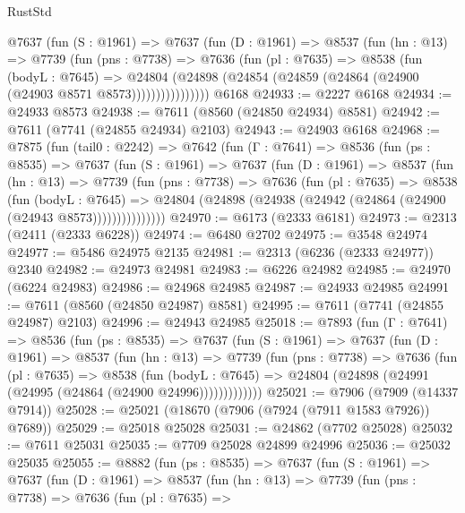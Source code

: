 \begin{lexlean}{RustStd}
\begin{coremodule}
          @7637
            (fun (S : @1961) =>
            @7637
              (fun (D : @1961) =>
              @8537
                (fun (hn : @13) =>
                @7739
                  (fun (pns : @7738) =>
                  @7636
                    (fun (pl : @7635) =>
                    @8538
                      (fun (bodyL : @7645) =>
                      @24804
                        (@24898 (@24854 (@24859 (@24864 (@24900 (@24903 @8571 @8573))))))))))))))))
    @6168
@24933 := @2227 @6168
@24934 := @24933 @8573
@24938 := @7611 (@8560 (@24850 @24934) @8581)
@24942 := @7611 (@7741 (@24855 @24934) @2103)
@24943 := @24903 @6168
@24968 := @7875
    (fun (tail0 : @2242) =>
    @7642
      (fun (Γ : @7641) =>
      @8536
        (fun (ps : @8535) =>
        @7637
          (fun (S : @1961) =>
          @7637
            (fun (D : @1961) =>
            @8537
              (fun (hn : @13) =>
              @7739
                (fun (pns : @7738) =>
                @7636
                  (fun (pl : @7635) =>
                  @8538
                    (fun (bodyL : @7645) =>
                    @24804 (@24898 (@24938 (@24942 (@24864 (@24900 (@24943 @8573)))))))))))))))
@24970 := @6173 (@2333 @6181)
@24973 := @2313 (@2411 (@2333 @6228))
@24974 := @6480 @2702
@24975 := @3548 @24974
@24977 := @5486 @24975 @2135
@24981 := @2313 (@6236 (@2333 @24977)) @2340
@24982 := @24973 @24981
@24983 := @6226 @24982
@24985 := @24970 (@6224 @24983)
@24986 := @24968 @24985
@24987 := @24933 @24985
@24991 := @7611 (@8560 (@24850 @24987) @8581)
@24995 := @7611 (@7741 (@24855 @24987) @2103)
@24996 := @24943 @24985
@25018 := @7893
    (fun (Γ : @7641) =>
    @8536
      (fun (ps : @8535) =>
      @7637
        (fun (S : @1961) =>
        @7637
          (fun (D : @1961) =>
          @8537
            (fun (hn : @13) =>
            @7739
              (fun (pns : @7738) =>
              @7636
                (fun (pl : @7635) =>
                @8538
                  (fun (bodyL : @7645) =>
                  @24804 (@24898 (@24991 (@24995 (@24864 (@24900 @24996)))))))))))))
@25021 := @7906 (@7909 (@14337 @7914))
@25028 := @25021 (@18670 (@7906 (@7924 (@7911 @1583 @7926)) @7689))
@25029 := @25018 @25028
@25031 := @24862 (@7702 @25028)
@25032 := @7611 @25031
@25035 := @7709 @25028 @24899 @24996
@25036 := @25032 @25035
@25055 := @8882
    (fun (ps : @8535) =>
    @7637
      (fun (S : @1961) =>
      @7637
        (fun (D : @1961) =>
        @8537
          (fun (hn : @13) =>
          @7739
            (fun (pns : @7738) =>
            @7636
              (fun (pl : @7635) =>

\end{coremodule}
\end{lexlean}
